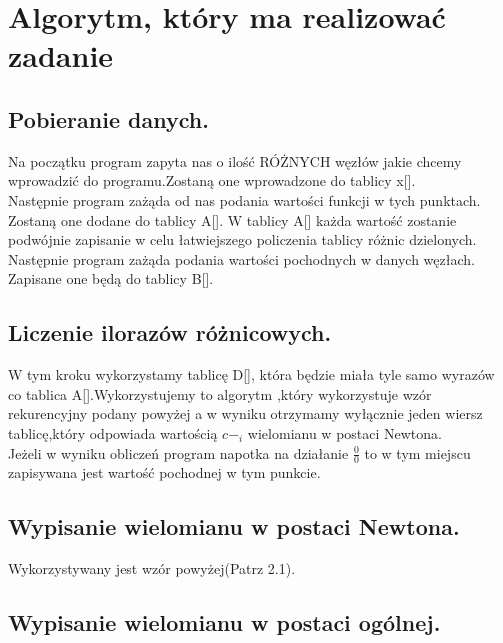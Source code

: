 \documentclass[16pt]{article} %
\begin{document}
\section{Algorytm, który ma realizować zadanie}
\subsection{Pobieranie danych.}
Na początku program zapyta nas o ilość RÓŻNYCH węzłów jakie chcemy wprowadzić do programu.Zostaną one wprowadzone do tablicy x[].\\
Następnie program zażąda od nas podania wartości funkcji w tych punktach. Zostaną one dodane do tablicy A[]. W tablicy A[] każda wartość zostanie podwójnie zapisanie w celu łatwiejszego 
policzenia tablicy różnic dzielonych.\\Następnie program zażąda podania wartości pochodnych w danych węzłach. Zapisane one będą do tablicy B[].\\
\subsection{Liczenie ilorazów różnicowych.}
W tym kroku wykorzystamy tablicę D[], która będzie miała tyle samo wyrazów co tablica A[].Wykorzystujemy to algorytm ,który wykorzystuje wzór rekurencyjny podany powyżej
a w wyniku otrzymamy wyłącznie jeden wiersz tablicę,który odpowiada wartością $c-_i$ wielomianu w postaci Newtona.\\
Jeżeli w wyniku obliczeń program napotka na działanie $\frac{0}{0}$ to w tym miejscu zapisywana jest wartość pochodnej w tym punkcie.

\subsection{Wypisanie wielomianu w postaci Newtona.}
Wykorzystywany jest wzór powyżej(Patrz 2.1).
\subsection{Wypisanie wielomianu w postaci ogólnej.}
\end{document}

